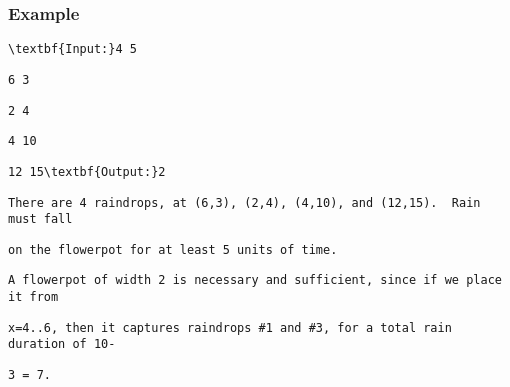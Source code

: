 \subsubsection{Example}
\begin{verbatim}
\textbf{Input:}4 5 \end{verbatim}
\begin{verbatim}
6 3 \end{verbatim}
\begin{verbatim}
2 4 \end{verbatim}
\begin{verbatim}
4 10 \end{verbatim}
\begin{verbatim}
12 15\textbf{Output:}2\end{verbatim}
\begin{verbatim}
There are 4 raindrops, at (6,3), (2,4), (4,10), and (12,15).  Rain must fall \end{verbatim}
\begin{verbatim}
on the flowerpot for at least 5 units of time.\end{verbatim}
\begin{verbatim}
A flowerpot of width 2 is necessary and sufficient, since if we place it from \end{verbatim}
\begin{verbatim}
x=4..6, then it captures raindrops #1 and #3, for a total rain duration of 10-\end{verbatim}
\begin{verbatim}
3 = 7.\end{verbatim}